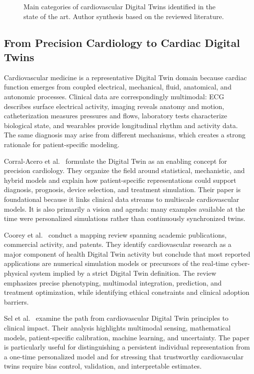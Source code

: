 \begin{figure}[H]
    \centering
    \resizebox{0.98\textwidth}{!}{}
    \caption{Main categories of cardiovascular Digital Twins identified in the state of the art. Author synthesis based on the reviewed literature.}
    \label{fig:cardiovascular_dt_taxonomy}
\end{figure}

\subsection{From Precision Cardiology to Cardiac Digital Twins}
Cardiovascular medicine is a representative Digital Twin domain because cardiac function emerges from coupled electrical, mechanical, fluid, anatomical, and autonomic processes. Clinical data are correspondingly multimodal: ECG describes surface electrical activity, imaging reveals anatomy and motion, catheterization measures pressures and flows, laboratory tests characterize biological state, and wearables provide longitudinal rhythm and activity data. The same diagnosis may arise from different mechanisms, which creates a strong rationale for patient-specific modeling.

Corral-Acero et al.~\cite{corral2020digital} formulate the Digital Twin as an enabling concept for precision cardiology. They organize the field around statistical, mechanistic, and hybrid models and explain how patient-specific representations could support diagnosis, prognosis, device selection, and treatment simulation. Their paper is foundational because it links clinical data streams to multiscale cardiovascular models. It is also primarily a vision and agenda: many examples available at the time were personalized simulations rather than continuously synchronized twins.

Coorey et al.~\cite{coorey2022health} conduct a mapping review spanning academic publications, commercial activity, and patents. They identify cardiovascular research as a major component of health Digital Twin activity but conclude that most reported applications are numerical simulation models or precursors of the real-time cyber-physical system implied by a strict Digital Twin definition. The review emphasizes precise phenotyping, multimodal integration, prediction, and treatment optimization, while identifying ethical constraints and clinical adoption barriers.

Sel et al.~\cite{sel2024building} examine the path from cardiovascular Digital Twin principles to clinical impact. Their analysis highlights multimodal sensing, mathematical models, patient-specific calibration, machine learning, and uncertainty. The paper is particularly useful for distinguishing a persistent individual representation from a one-time personalized model and for stressing that trustworthy cardiovascular twins require bias control, validation, and interpretable estimates.

